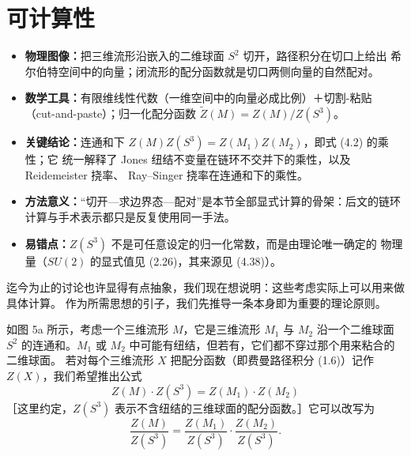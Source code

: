 \documentclass[11pt,a4paper]{article}
\newenvironment{keypoints}{%
    \par\medskip
    \begin{tcolorbox}[enhanced, breakable,
        colback=blue!4!white, colframe=blue!40!black,
        boxrule=0.5pt, arc=2pt, left=6pt, right=6pt, top=4pt, bottom=4pt,
        title={\small\textbf{本节重点}\quad{\footnotesize（译者所加，非原文内容）}},
        fonttitle=\bfseries, coltitle=black, colbacktitle=blue!10!white,
        toptitle=1pt, bottomtitle=1pt]
    \begin{itemize}[leftmargin=1.4em, itemsep=2pt, topsep=2pt, parsep=0pt]
}{%
    \end{itemize}
    \end{tcolorbox}
    \par\medskip
}
\begin{document}


\section{可计算性}

\begin{keypoints}
    \item \textbf{物理图像：}把三维流形沿嵌入的二维球面 $S^2$ 切开，路径积分在切口上给出
          希尔伯特空间中的向量；闭流形的配分函数就是切口两侧向量的自然配对。
    \item \textbf{数学工具：}有限维线性代数（一维空间中的向量必成比例）＋切割-粘贴
          （cut-and-paste）；归一化配分函数 $\tilde{Z}(M)=Z(M)/Z(S^3)$。
    \item \textbf{关键结论：}连通和下 $Z(M)Z(S^3)=Z(M_1)Z(M_2)$，即式 (4.2) 的乘性；它
          统一解释了 Jones 纽结不变量在链环不交并下的乘性，以及 Reidemeister 挠率、
          Ray–Singer 挠率在连通和下的乘性。
    \item \textbf{方法意义：}“切开—求边界态—配对”是本节全部显式计算的骨架：后文的链环
          计算与手术表示都只是反复使用同一手法。
    \item \textbf{易错点：}$Z(S^3)$ 不是可任意设定的归一化常数，而是由理论唯一确定的
          物理量（$SU(2)$ 的显式值见 (2.26)，其来源见 (4.38)）。
\end{keypoints}

迄今为止的讨论也许显得有点抽象，我们现在想说明：这些考虑实际上可以用来做具体计算。
作为所需思想的引子，我们先推导一条本身即为重要的理论原则。

如图 5a 所示，考虑一个三维流形 $M$，它是三维流形 $M_1$ 与 $M_2$ 沿一个二维球面 $S^2$
的连通和。$M_1$ 或 $M_2$ 中可能有纽结，但若有，它们都不穿过那个用来粘合的二维球面。
若对每个三维流形 $X$ 把配分函数（即费曼路径积分 (1.6)）记作 $Z(X)$，我们希望推出公式
\begin{equation}
    Z(M)\cdot Z(S^3)=Z(M_1)\cdot Z(M_2)
    \tag{4.1}
\end{equation}
［这里约定，$Z(S^3)$ 表示不含纽结的三维球面的配分函数。］它可以改写为
\begin{equation}
    \frac{Z(M)}{Z(S^3)}=\frac{Z(M_1)}{Z(S^3)}\cdot\frac{Z(M_2)}{Z(S^3)}.
    \tag{4.2}
\end{equation}
\end{document}
